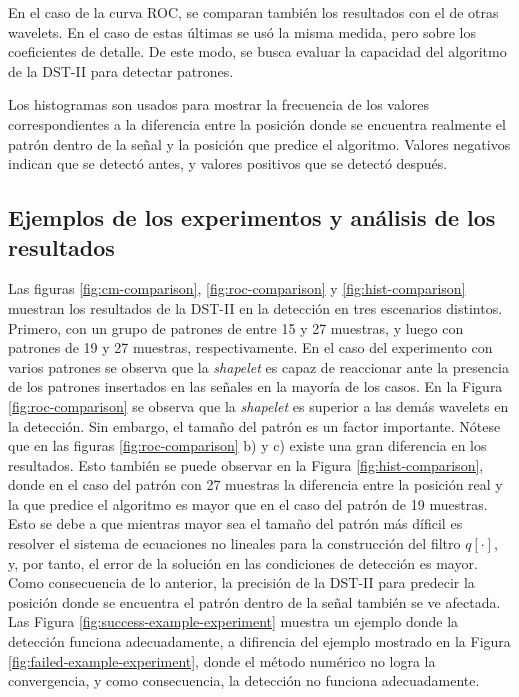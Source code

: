 En el caso de la curva ROC, se comparan también los resultados con el de otras wavelets. En el caso de estas
últimas se usó la misma medida, pero sobre los coeficientes de detalle. De este modo, se busca evaluar 
la capacidad del algoritmo de la DST-II para detectar patrones.

Los histogramas son usados para mostrar la frecuencia de los valores correspondientes a la diferencia entre
la posición donde se encuentra realmente el patrón dentro de la señal y la posición que predice el algoritmo.
Valores negativos indican que se detectó antes, y valores positivos que se detectó después.

\subsection{Ejemplos de los experimentos y análisis de los resultados}

Las figuras \ref{fig:cm-comparison}, \ref{fig:roc-comparison} y \ref{fig:hist-comparison} 
muestran los resultados de la DST-II en la detección en tres escenarios distintos.
Primero, con un grupo de patrones de entre 15 y 27 muestras, y luego con patrones de 19 y 27 
muestras, respectivamente. En el caso del experimento con varios patrones se observa que 
la \textit{shapelet} es capaz de reaccionar ante la presencia de los patrones insertados en las señales en 
la mayoría de los casos. En la Figura \ref{fig:roc-comparison} se observa que la \textit{shapelet}
es superior a las demás wavelets en la detección. Sin embargo, el tamaño del patrón es un factor
importante. Nótese que en las figuras \ref{fig:roc-comparison} b) y c) existe una gran diferencia
en los resultados. Esto también se puede observar en la Figura \ref{fig:hist-comparison}, donde 
en el caso del patrón con 27 muestras
la diferencia entre la posición real y la que predice el algoritmo es mayor que en el caso del patrón 
de 19 muestras. Esto se debe a que mientras mayor sea el tamaño del patrón más díficil es resolver
el sistema de ecuaciones no lineales para la construcción del filtro $q[\cdot]$, y, por tanto, el error
de la solución en las condiciones de detección es mayor. Como consecuencia de lo anterior,
la precisión de la DST-II para predecir la posición donde se encuentra el patrón dentro de la señal también
se ve afectada. Las Figura \ref{fig:success-example-experiment} muestra un ejemplo donde la detección
funciona adecuadamente, a difirencia del ejemplo mostrado en la Figura \ref{fig:failed-example-experiment}, donde
el método numérico no logra la convergencia, y como consecuencia, la detección no funciona adecuadamente.

